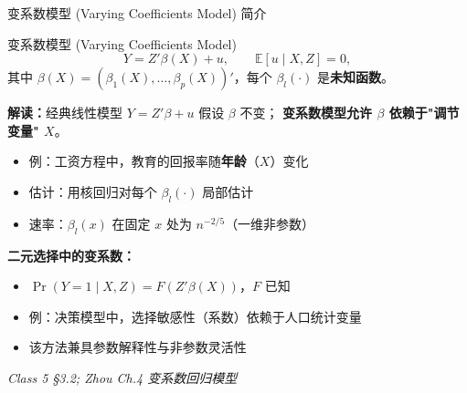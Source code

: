 \documentclass[aspectratio=169, 10pt]{beamer}
\begin{document}
\begin{frame}[shrink=20]{变系数模型 (Varying Coefficients Model) 简介}

  \begin{definitionbox}{{变系数模型 (Varying Coefficients Model)}}
    $$Y = Z'\beta(X) + u, \qquad \mathbb{E}[u\mid X, Z] = 0,$$
    其中 $\beta(X) = (\beta_1(X), \ldots, \beta_p(X))'$，每个 $\beta_l(\cdot)$
    是\textbf{未知函数}。
  \end{definitionbox}

  \begin{highlightbox}
    \textbf{解读：}经典线性模型 $Y = Z'\beta + u$ 假设 $\beta$ 不变；
    \textbf{变系数模型允许 $\beta$ 依赖于"调节变量" $X$}。
    \begin{itemize}\setlength{\itemsep}{1pt}
      \item 例：工资方程中，教育的回报率随\textbf{年龄}（$X$）变化
      \item 估计：用核回归对每个 $\beta_l(\cdot)$ 局部估计
      \item 速率：$\beta_l(x)$ 在固定 $x$ 处为 $n^{-2/5}$（一维非参数）
    \end{itemize}
  \end{highlightbox}

  \begin{keybox}
    \textbf{二元选择中的变系数：}
    \begin{itemize}\setlength{\itemsep}{1pt}
      \item $\Pr(Y=1\mid X, Z) = F(Z'\beta(X))$，$F$ 已知
      \item 例：决策模型中，选择敏感性（系数）依赖于人口统计变量
      \item 该方法兼具参数解释性与非参数灵活性
    \end{itemize}
  \end{keybox}

  \hfill{\scriptsize\textit{Class 5 §3.2; Zhou Ch.4 变系数回归模型}}

\end{frame}
\end{document}
